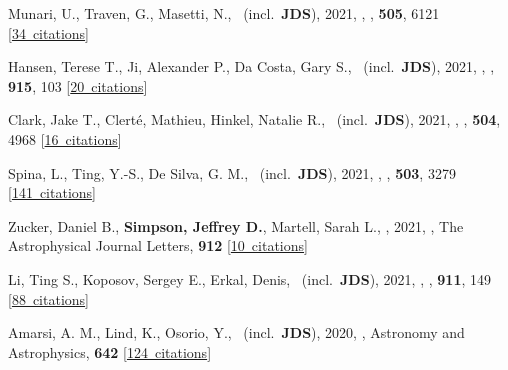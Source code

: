 \item[{\color{numcolor}\scriptsize57}] Munari, U., Traven, G., Masetti, N., \etal\ (incl.\ \textbf{JDS}), 2021, , \mnras, \textbf{505}, 6121 [\href{https://ui.adsabs.harvard.edu/#abs/2021MNRAS.505.6121M}{34~citations}]

\item[{\color{numcolor}\scriptsize56}] Hansen, Terese T., Ji, Alexander P., Da Costa, Gary S., \etal\ (incl.\ \textbf{JDS}), 2021, , \apj, \textbf{915}, 103 [\href{https://ui.adsabs.harvard.edu/#abs/2021ApJ...915..103H}{20~citations}]

\item[{\color{numcolor}\scriptsize55}] Clark, Jake T., Clert{\'e}, Mathieu, Hinkel, Natalie R., \etal\ (incl.\ \textbf{JDS}), 2021, , \mnras, \textbf{504}, 4968 [\href{https://ui.adsabs.harvard.edu/#abs/2021MNRAS.504.4968C}{16~citations}]

\item[{\color{numcolor}\scriptsize54}] Spina, L., Ting, Y.-S., De Silva, G. M., \etal\ (incl.\ \textbf{JDS}), 2021, , \mnras, \textbf{503}, 3279 [\href{https://ui.adsabs.harvard.edu/#abs/2021MNRAS.503.3279S}{141~citations}]

\item[{\color{numcolor}\scriptsize53}] Zucker, Daniel B., \textbf{Simpson, Jeffrey D.}, Martell, Sarah L., \etal, 2021, , The Astrophysical Journal Letters, \textbf{912} [\href{https://ui.adsabs.harvard.edu/#abs/2021ApJ...912L..30Z}{10~citations}]

\item[{\color{numcolor}\scriptsize52}] Li, Ting S., Koposov, Sergey E., Erkal, Denis, \etal\ (incl.\ \textbf{JDS}), 2021, , \apj, \textbf{911}, 149 [\href{https://ui.adsabs.harvard.edu/#abs/2021ApJ...911..149L}{88~citations}]

\item[{\color{numcolor}\scriptsize51}] Amarsi, A. M., Lind, K., Osorio, Y., \etal\ (incl.\ \textbf{JDS}), 2020, , Astronomy and Astrophysics, \textbf{642} [\href{https://ui.adsabs.harvard.edu/#abs/2020A&A...642A..62A}{124~citations}]


